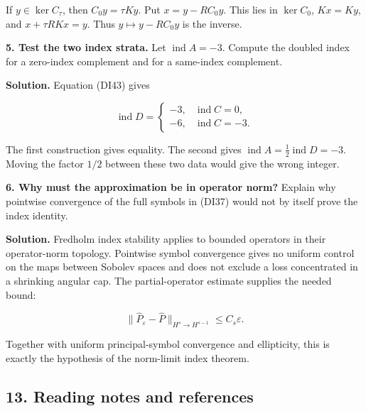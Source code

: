 \documentclass[
  11pt,
]{article}
\makeatletter
\let\ReaderOriginalAnchorStart\hyper@anchorstart
\let\ReaderOriginalAnchorEnd\hyper@anchorend
\let\ReaderPendingAliases\@empty
\def\ReaderArmAliases#1{\gdef\ReaderPendingAliases{#1}}
\def\hyper@anchorstart#1{\ReaderIfNativeAnchorTF{#1}{\ReaderPendingAliases\global\let\ReaderPendingAliases\@empty}{}\ReaderOriginalAnchorStart{#1}}
\makeatother
\begin{document}
If \(y\in\ker C_\tau\), then \(C_0y=\tau Ky\). Put \(x=y-RC_0y\). This
lies in \(\ker C_0\), \(Kx=Ky\), and \(x+\tau RKx=y\). Thus
\(y\mapsto y-RC_0y\) is the inverse.

\textbf{5. Test the two index strata.} Let \(\operatorname{ind}A=-3\).
Compute the doubled index for a zero-index complement and for a
same-index complement.

\textbf{Solution.} Equation (DI43) gives

\[
 \operatorname{ind}D=
 \begin{cases}
 -3,&\operatorname{ind}C=0,\\
 -6,&\operatorname{ind}C=-3.
 \end{cases}
 \tag{DI54}
\]

The first construction gives equality. The second gives
\(\operatorname{ind}A=\frac12\operatorname{ind}D=-3\). Moving the factor
\(1/2\) between these two data would give the wrong integer.

\textbf{6. Why must the approximation be in operator norm?} Explain why
pointwise convergence of the full symbols in (DI37) would not by itself
prove the index identity.

\textbf{Solution.} Fredholm index stability applies to bounded operators
in their operator-norm topology. Pointwise symbol convergence gives no
uniform control on the maps between Sobolev spaces and does not exclude
a loss concentrated in a shrinking angular cap. The partial-operator
estimate supplies the needed bound:

\[
 \|\widehat P_\varepsilon-\widehat P\|_{H^s\to H^{s-1}}
 \leq C_s\varepsilon.
 \tag{DI55}
\]

Together with uniform principal-symbol convergence and ellipticity, this
is exactly the hypothesis of the norm-limit index theorem.

\ReaderArmAliases{\ReaderOriginalAnchorStart{AN03-SDI-013}\ReaderOriginalAnchorEnd\begingroup\expandafter\def\csname @currentHref\endcsname{AN03-SDI-013}\label{AN03-SDI-013}\endgroup\ReaderOriginalAnchorStart{13-reading-notes-and-references}\ReaderOriginalAnchorEnd\begingroup\expandafter\def\csname @currentHref\endcsname{13-reading-notes-and-references}\label{13-reading-notes-and-references}\endgroup\ReaderOriginalAnchorStart{reading-notes-and-references}\ReaderOriginalAnchorEnd}
\subsection{13. Reading notes and
references}\label{reading-notes-and-references}
\end{document}
